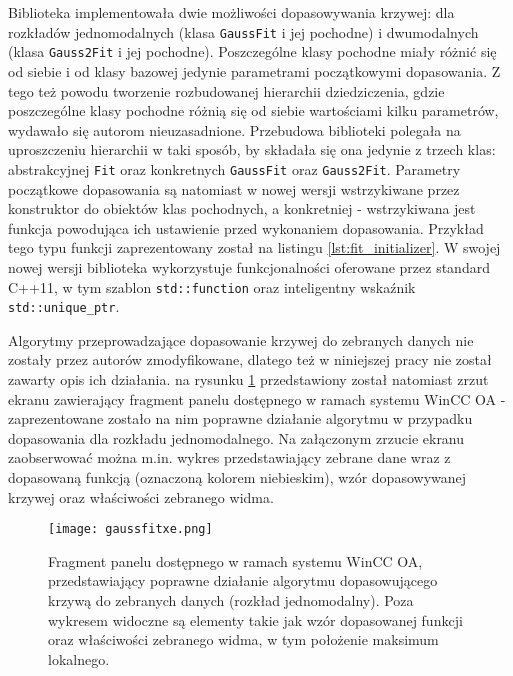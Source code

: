 Biblioteka implementowała dwie możliwości dopasowywania krzywej: dla rozkładów jednomodalnych (klasa \lstinline{GaussFit} i jej pochodne) i dwumodalnych (klasa \lstinline{Gauss2Fit} i jej pochodne). Poszczególne klasy pochodne miały różnić się od siebie i od klasy bazowej jedynie parametrami początkowymi dopasowania. Z tego też powodu tworzenie rozbudowanej hierarchii dziedziczenia, gdzie poszczególne klasy pochodne różnią się od siebie wartościami kilku parametrów, wydawało się autorom nieuzasadnione. Przebudowa biblioteki polegała na uproszczeniu hierarchii w taki sposób, by składała się ona jedynie z trzech klas: abstrakcyjnej \lstinline{Fit} oraz konkretnych \lstinline{GaussFit} oraz \lstinline{Gauss2Fit}. Parametry początkowe dopasowania są natomiast w nowej wersji wstrzykiwane przez konstruktor do obiektów klas pochodnych, a konkretniej - wstrzykiwana jest funkcja powodująca ich ustawienie przed wykonaniem dopasowania. Przykład tego typu funkcji zaprezentowany został na listingu \ref{lst:fit_initializer}. W swojej nowej wersji biblioteka wykorzystuje funkcjonalności oferowane przez standard C++11, w tym szablon \lstinline{std::function} oraz inteligentny wskaźnik \lstinline{std::unique_ptr}.



Algorytmy przeprowadzające dopasowanie krzywej do zebranych danych nie zostały przez autorów zmodyfikowane, dlatego też w niniejszej pracy nie został zawarty opis ich działania. na rysunku \ref{fig:fit_example_good_1} przedstawiony został natomiast zrzut ekranu zawierający fragment panelu dostępnego w ramach systemu WinCC OA - zaprezentowane zostało na nim poprawne działanie algorytmu w przypadku dopasowania dla rozkładu jednomodalnego. Na załączonym zrzucie ekranu zaobserwować można m.in. wykres przedstawiający zebrane dane wraz z dopasowaną funkcją (oznaczoną kolorem niebieskim), wzór dopasowywanej krzywej oraz właściwości zebranego widma.

\begin{figure}[H]
\centering
\texttt{[image: gaussfitxe.png]}
\caption{Fragment panelu dostępnego w ramach systemu WinCC OA, przedstawiający poprawne działanie algorytmu dopasowującego krzywą do zebranych danych (rozkład jednomodalny). Poza wykresem widoczne są elementy takie jak wzór dopasowanej funkcji oraz właściwości zebranego widma, w tym położenie maksimum lokalnego.}
\label{fig:fit_example_good_1}
\end{figure}


